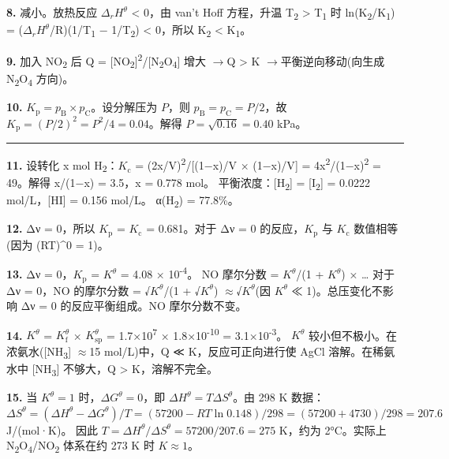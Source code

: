 \documentclass[a4paper,11pt]{ctexart}
\newcommand{\箭}{\ensuremath{\rightarrow}}
\newcommand{\左箭}{\ensuremath{\leftarrow}}
\newcommand{\上箭}{\ensuremath{\uparrow}}
\newcommand{\下箭}{\ensuremath{\downarrow}}
\newcommand{\衡}{\ensuremath{\rightleftharpoons}}
\newcommand{\双箭}{\ensuremath{\leftrightarrow}}
\newcommand{\约等于}{\ensuremath{\approx}}
\newcommand{\小于等于}{\ensuremath{\leq}}
\newcommand{\大于等于}{\ensuremath{\geq}}
\newcommand{\不等于}{\ensuremath{\neq}}
\newcommand{\西格马}{\ensuremath{\sigma}}
\newcommand{\派}{\ensuremath{\pi}}
\begin{document}
\textbf{8.} 减小。放热反应 \(\Delta_r H^\theta\) \textless{} 0，由 van't Hoff 方程，升温 T\textsubscript{2} \textgreater{} T\textsubscript{1} 时 ln(K\textsubscript{2}/K\textsubscript{1}) = (\(\Delta_r H^\theta\)/R)(1/T\textsubscript{1} − 1/T\textsubscript{2}) \textless{} 0，所以 K\textsubscript{2} \textless{} K\textsubscript{1}。

\textbf{9.} 加入 NO\textsubscript{2} 后 Q = {[}NO\textsubscript{2}{]}\textsuperscript{2}/{[}N\textsubscript{2}O\textsubscript{4}{]} 增大 \箭 Q \textgreater{} K \箭 平衡逆向移动(向生成 N\textsubscript{2}O\textsubscript{4} 方向)。

\textbf{10.} \(K_{\mathrm p} = p_{\mathrm B} \times p_{\mathrm C}\)。设分解压为 \(P\)，则 \(p_{\mathrm B} = p_{\mathrm C} = P/2\)，故 \(K_{\mathrm p} = (P/2)^2 = P^2/4 = 0.04\)。解得 \(P = \sqrt{0.16} = 0.40\) kPa。

\begin{center}\rule{0.5\linewidth}{0.5pt}\end{center}

\textbf{11.} 设转化 x mol H\textsubscript{2}：\(K_{\mathrm c}\) = (2x/V)\textsuperscript{2}/{[}(1−x)/V × (1−x)/V{]} = 4x\textsuperscript{2}/(1−x)\textsuperscript{2} = 49。解得 x/(1−x) = 3.5，x = 0.778 mol。
平衡浓度：{[}H\textsubscript{2}{]} = {[}I\textsubscript{2}{]} = 0.0222 mol/L，{[}HI{]} = 0.156 mol/L。
α(H\textsubscript{2}) = 77.8\%。

\textbf{12.} Δν = 0，所以 \(K_{\mathrm p}\) = \(K_{\mathrm c}\) = 0.681。对于 Δν = 0 的反应，\(K_{\mathrm p}\) 与 \(K_{\mathrm c}\) 数值相等(因为 (RT)\^{}0 = 1)。

\textbf{13.} Δν = 0，\(K_{\mathrm p}\) = \(K^\theta\) = 4.08 × 10\textsuperscript{-4}。
NO 摩尔分数 = \(K^\theta\)/(1 + \(K^\theta\)) × \ldots{} 对于 Δν = 0，NO 的摩尔分数 = √\(K^\theta\)/(1 + √\(K^\theta\)) \约等于 √\(K^\theta\)(因 \(K^\theta\) ≪ 1)。总压变化不影响 Δν = 0 的反应平衡组成。NO 摩尔分数不变。

\textbf{14.} \(K^\theta\) = \(K_{\mathrm f}^\theta\) × \(K_{\mathrm{sp}}^\theta\) = 1.7×10\textsuperscript{7} × 1.8×10\textsuperscript{-10} = 3.1×10\textsuperscript{-3}。
\(K^\theta\) 较小但不极小。在浓氨水({[}NH\textsubscript{3}{]} \约等于 15 mol/L)中，Q ≪ K，反应可正向进行使 AgCl 溶解。在稀氨水中 {[}NH\textsubscript{3}{]} 不够大，Q \textgreater{} K，溶解不完全。

\textbf{15.} 当 \(K^\theta = 1\) 时，\(\Delta G^\theta = 0\)，即 \(\Delta H^\theta = T\Delta S^\theta\)。由 298 K 数据：
\(\Delta S^\theta = (\Delta H^\theta - \Delta G^\theta)/T = (57200 - RT\ln 0.148)/298 = (57200 + 4730)/298 = 207.6\) J/(mol·K)。
因此 \(T = \Delta H^\theta/\Delta S^\theta = 57200/207.6 = 275\) K，约为 2°C。实际上 N\textsubscript{2}O\textsubscript{4}/NO\textsubscript{2} 体系在约 273 K 时 \(K \approx 1\)。
\end{document}
